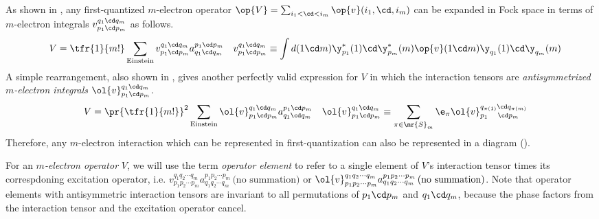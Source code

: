 \documentclass[11pt,fleqn]{article}
\numberwithin{equation}{section}
\begin{document}
\begin{rmk}
As shown in ,
any first-quantized $m$-electron operator
$
  \op{V}=\sum_{i_1<\cd<i_m}\op{v}(i_1,\cd, i_m)
$
can be expanded in Fock space in terms of $m$-electron integrals $v_{p_1\cd p_m}^{q_1\cd q_m}$ as follows.
\begin{align*}
&&
  V
=
  \tfr{1}{m!}
  \sum_{\text{Einstein}}
  v_{p_1\cd p_m}^{q_1\cd q_m}
  a^{p_1\cd p_m}_{q_1\cd q_m}
&&
  v_{p_1\cd p_m}^{q_1\cd q_m}
\equiv
  \int d(1\cd m)\y_{p_1}^*(1)\cd \y_{p_m}^*(m)\op{v}(1\cd m)\y_{q_1}(1)\cd \y_{q_m}(m)
\end{align*}
A simple rearrangement, also shown in , gives another perfectly valid expression for $V$ in which the interaction tensors are \textit{antisymmetrized $m$-electron integrals} $\ol{v}_{p_1\cd p_m}^{q_1\cd q_m}$.
\begin{align*}
&&
  V
=
  \pr{\tfr{1}{m!}}^2
  \sum_{\text{Einstein}}
  \ol{v}_{p_1\cd p_m}^{q_1\cd q_m}
  a^{p_1\cd p_m}_{q_1\cd q_m}
&&
  \ol{v}_{p_1\cd p_m}^{q_1\cd q_m}
\equiv
  \sum_{\pi\in\mr{S}_m}
  \e_{\pi}
  \ol{v}_{p_1\hphantom{_{\pi()}}\cd p_m}^{q_{\pi(1)}\cd q_{\pi(m)}}
\end{align*}
Therefore, any $m$-electron interaction which can be represented in first-quantization can also be represented in a diagram ().
\end{rmk}

\begin{dfn}
For an \textit{$m$-electron operator} $V$, we will use the term \textit{operator element} to refer to a single element of $V$'s interaction tensor times its correspdoning excitation operator, i.e.
$v_{p_1p_2\cdots p_m}^{q_1q_2\cdots q_m}
 a^{p_1p_2\cdots p_m}_{q_1q_2\cdots q_m}\,\text{(no summation)}$
or
$\ol{v}_{p_1p_2\cdots p_m}^{q_1q_2\cdots q_m}
 a^{p_1p_2\cdots p_m}_{q_1q_2\cdots q_m}\,\text{(no summation)}$.
Note that operator elements with antisymmetric interaction tensors are invariant to all permutations of $p_1\cd p_m$ and $q_1\cd q_m$, because the phase factors from the interaction tensor and the excitation operator cancel.
\end{dfn}
\end{document}
